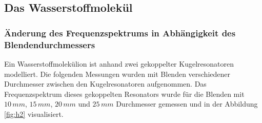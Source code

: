 \subsection{Das Wasserstoffmolekül}

\subsubsection{Änderung des Frequenzspektrums in Abhängigkeit des Blendendurchmessers}
\label{sec:h2peaks}
Ein Wasserstoffmolekülion ist anhand zwei gekoppelter Kugelresonatoren modelliert. Die folgenden Messungen wurden mit Blenden verschiedener Durchmesser zwischen den Kugelresonatoren 
aufgenommen. Das Frequenzspektrum dieses gekoppelten Resonators wurde für die Blenden mit $10\,mm$, $15\,mm$, $20\,mm$ und $25\,mm$ Durchmesser gemessen und in der Abbildung \ref{fig:h2} visualisiert. \\\\

